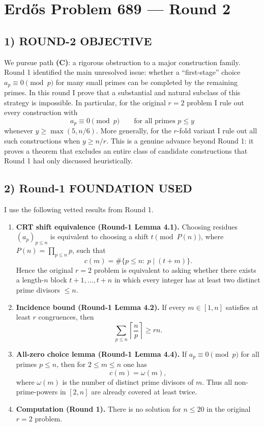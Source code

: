 \section{Erd\H{o}s Problem 689 --- Round 2}

\subsection*{1) ROUND-2 OBJECTIVE}

We pursue path \textbf{(C)}: a rigorous obstruction to a major construction family.
Round 1 identified the main unresolved issue: whether a ``first-stage'' choice
\(a_p\equiv 0\pmod p\) for many small primes can be completed by the remaining primes.
In this round I prove that a substantial and natural subclass of this strategy is impossible.
In particular, for the original \(r=2\) problem I rule out every construction with
\[
a_p\equiv 0 \pmod p \qquad\text{for all primes }p\le y
\]
whenever \(y\ge \max(5,n/6)\).
More generally, for the \(r\)-fold variant I rule out all such constructions when \(y\ge n/r\).
This is a genuine advance beyond Round 1: it proves a theorem that excludes an entire class
of candidate constructions that Round 1 had only discussed heuristically.

\subsection*{2) Round-1 FOUNDATION USED}

I use the following vetted results from Round 1.
\begin{enumerate}
\item \textbf{CRT shift equivalence (Round-1 Lemma 4.1).}
Choosing residues \((a_p)_{p\le n}\) is equivalent to choosing a shift \(t\pmod{P(n)}\),
where \(P(n)=\prod_{p\le n}p\), such that
\[
c(m)=\#\{p\le n:\ p\mid (t+m)\}.
\]
Hence the original \(r=2\) problem is equivalent to asking whether there exists a length-\(n\)
block \(t+1,\dots,t+n\) in which every integer has at least two distinct prime divisors \(\le n\).

\item \textbf{Incidence bound (Round-1 Lemma 4.2).}
If every \(m\in[1,n]\) satisfies at least \(r\) congruences, then
\[
\sum_{p\le n}\left\lceil \frac{n}{p}\right\rceil \ge rn.
\]

\item \textbf{All-zero choice lemma (Round-1 Lemma 4.4).}
If \(a_p\equiv 0\pmod p\) for all primes \(p\le n\), then for \(2\le m\le n\) one has
\[
c(m)=\omega(m),
\]
where \(\omega(m)\) is the number of distinct prime divisors of \(m\).
Thus all non-prime-powers in \([2,n]\) are already covered at least twice.

\item \textbf{Computation (Round 1).}
There is no solution for \(n\le 20\) in the original \(r=2\) problem.
\end{enumerate}

